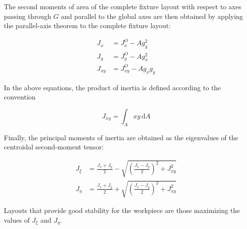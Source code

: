 The second moments of area of the complete fixture layout with respect to
axes passing through $G$ and parallel to the global axes are then obtained
by applying the parallel-axis theorem to the complete fixture layout:

\begin{align*}
	J_x
	&=
	J_x^{O}-A g_y^{2}
	\\
	J_y
	&=
	J_y^{O}-A g_x^{2}
	\\
	J_{xy}
	&=
	J_{xy}^{O}-A g_x g_y
\end{align*}

In the above equations, the product of inertia is defined according to the
convention

\begin{equation*}
	J_{xy}=\int_A xy\,\mathrm{d}A
\end{equation*}

Finally, the principal moments of inertia are obtained as the eigenvalues of
the centroidal second-moment tensor:

\begin{align*}
	J_{\xi}
	&=
	\frac{J_x+J_y}{2}
	-
	\sqrt{
		\left(
		\frac{J_x-J_y}{2}
		\right)^2
		+
		J_{xy}^{2}
	}
	\\
	J_{\eta}
	&=
	\frac{J_x+J_y}{2}
	+
	\sqrt{
		\left(
		\frac{J_x-J_y}{2}
		\right)^2
		+
		J_{xy}^{2}
	}
\end{align*}

Layouts that provide good stability for the workpiece are those maximizing the values of $J_{\xi}$ and $J_{\eta}$.


